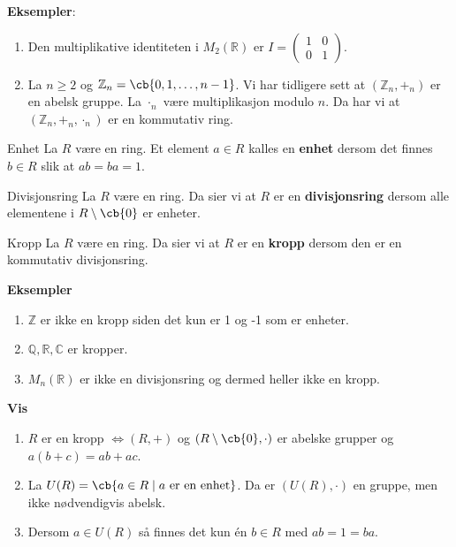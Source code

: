 \textbf{Eksempler}:
\begin{enumerate}
  \item Den multiplikative identiteten i $M_2(\mathbb{R})$ er 
    $I = \begin{pmatrix} 1 & 0 \\ 0 & 1 \end{pmatrix}$.
  \item La $n \geq 2$ og $\mathbb{Z}_n = \cb{0, 1, \dots, n-1}$. Vi har tidligere sett at
    $(\mathbb{Z}_n, +_n)$ er en abelsk gruppe. La $\cdot_n$ være multiplikasjon modulo $n$. Da
    har vi at $(\mathbb{Z}_n, +_n, \cdot_n)$ er en kommutativ ring.
\end{enumerate}

\begin{definition}{Enhet}{}
  La $R$ være en ring. Et element $a\in R$ kalles en \textbf{enhet} dersom det finnes $b\in R$
  slik at $ab = ba = 1$.
\end{definition}

\begin{definition}{Divisjonsring}{}
  La $R$ være en ring. Da sier vi at $R$ er en \textbf{divisjonsring} dersom alle elementene i
  $R\setminus \cb{0}$ er enheter.
\end{definition}

\begin{definition}{Kropp}{}
  La $R$ være en ring. Da sier vi at $R$ er en \textbf{kropp} dersom den er en kommutativ
  divisjonsring. 
\end{definition}

\textbf{Eksempler}
\begin{enumerate}
  \item $\mathbb{Z}$ er ikke en kropp siden det kun er 1 og -1 som er enheter.
  \item $\mathbb{Q}, \mathbb{R}, \mathbb{C}$ er kropper.
  \item $M_n(\mathbb{R})$ er ikke en divisjonsring og dermed heller ikke en kropp. 
\end{enumerate}

\textbf{Vis}
\begin{enumerate}
  \item $R$ er en kropp $\iff (R,+)$ og $(R \setminus \cb{0},\cdot)$ er abelske grupper og
    $a(b+c) = ab + ac$. 
  \item La $U(R) = \cb{a\in R\mid a \text{ er en enhet}}$. Da er $(U(R), \cdot)$ en gruppe, men 
    ikke nødvendigvis abelsk. 
  \item Dersom $a\in U(R)$ så finnes det kun én $b\in R$ med $ab = 1 = ba$. 
\end{enumerate}

